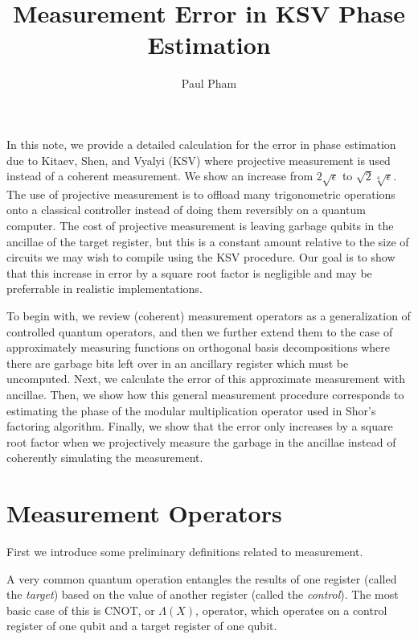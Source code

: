 \documentclass{article}
\title{Measurement Error in KSV Phase Estimation}
\author{Paul Pham}
\theoremstyle{definition} \newtheorem{lemma}{Lemma}
\theoremstyle{definition} \newtheorem{theorem}{Theorem}
\begin{document}
\maketitle

In this note, we provide a detailed calculation for the error in
phase estimation due to Kitaev, Shen, and Vyalyi (KSV) where projective
measurement is used instead of a coherent measurement. We show an
increase from $2\sqrt{\epsilon}$ to $\sqrt{2}\sqrt[4]{\epsilon}$. The use
of projective measurement is to offload many trigonometric operations
onto a classical controller instead of doing them reversibly on a quantum
computer. The cost of projective measurement is leaving garbage qubits in
the ancillae of the target register, but this is a constant amount relative to
the size of circuits we may wish to compile using the KSV procedure.
Our goal is to show that this increase in error by a square root
factor is negligible and may be preferrable in realistic implementations.

To begin with, we review (coherent) measurement operators as a generalization of
controlled quantum operators, and then we further extend them to the case
of approximately measuring functions on orthogonal basis decompositions
where there are garbage bits left over in an ancillary register which must
be uncomputed.
Next, we calculate the error of this approximate measurement with ancillae.
Then, we show how this general measurement procedure corresponds to
estimating the phase of the modular multiplication operator used in
Shor's factoring algorithm. Finally, we show that the error only
increases by a square root factor when we projectively measure the garbage
in the ancillae instead of coherently simulating the measurement.

\section{Measurement Operators}
\label{sec:meas-ops}

First we introduce some preliminary definitions related to measurement.

A very common quantum operation entangles the results of one register
(called the \emph{target}) based on the value of another register (called the
\emph{control}). The most basic case of this is CNOT, or $\Lambda(X)$,
operator, which operates
on a control register of one qubit and a target register of one qubit.
\end{document}

